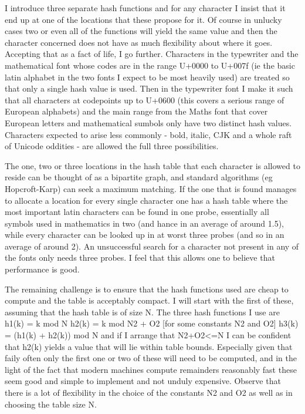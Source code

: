 \documentclass [a4paper,11pt]{article}
\begin{document}
I introduce three separate hash functions and for any character I insist 
that it end up at one of the locations that these propose for it. Of 
course in unlucky cases two or even all of the functions will yield the 
same value and then the character concerned does not have as much 
flexibility about where it goes. Accepting that as a fact of life, I go 
further. Characters in the typewriter and the mathematical font whose 
codes are in the range U+0000 to U+007f (ie the basic latin alphabet in 
the two fonts I expect to be most heavily used) are treated so that only a 
single hash value is used. Then in the typewriter font I make it such that 
all characters at codepoints up to U+0600 (this covers a serious range of 
European alphabets) and the main range from the Maths font that cover 
European letters and mathematical sumbols only have two distinct hash 
values. Characters expected to arise less commonly - bold, italic, CJK and 
a whole raft of Unicode oddities - are allowed the full three 
possibilities.

The one, two or three locations in the hash table that each character is 
allowed to reside can be thought of as a bipartite graph, and standard 
algorithms (eg Hopcroft-Karp) can seek a maximum matching. If the one that 
is found manages to allocate a location for every single character one has
a hash table where the most important latin characters can be found in one 
probe, essentially all symbols used in mathematics in two (and hance in an 
average of around 1.5), while every character can be looked up in at worst 
three probes (and so in an average of around 2). An unsuccessful search 
for a character not present in any of the fonts only needs three probes. I 
feel that this allows one to believe that performance is good.

The remaining challenge is to ensure that the hash functions used are 
cheap to compute and the table is acceptably compact. I will start with 
the first of these, assuming that the hash table is of size N. The three
hash functions I use are
    h1(k) = k mod N
    h2(k) = k mod N2 + O2  [for some constants N2 and O2]
    h3(k) = (h1(k) + h2(k)) mod N
and if I arrange that N2+O2<=N I can be confident that h2(k) yields a 
value that will lie within table bounds. Especially given that faily often 
only the first one or two of these will need to be computed, and in the 
light of the fact that modern machines compute remainders reasonably fast 
these seem good and simple to implement and not unduly expensive. Observe 
that there is a lot of flexibility in the choice of the constants N2 and 
O2 as well as in choosing the table size N.
\end{document}
